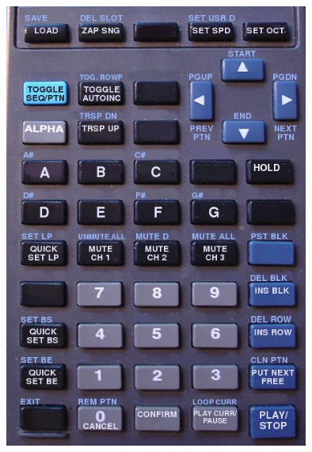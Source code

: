 \documentclass[12pt]{report}	%
\begin{document}
\begin{center}
{\includegraphics[width=0.75\textwidth]{keymap.jpg}} \newline
\end{center}
\end{document}
